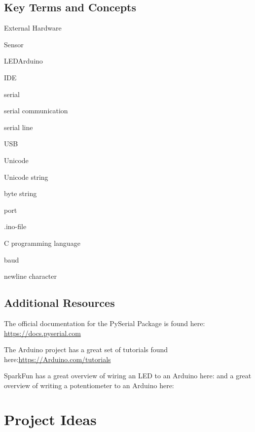 \documentclass{book}
\newenvironment{key_terms}{\begin{multicols}{3}}{\end{multicols}} %
\begin{document}
    
        \subsection{Key Terms and Concepts}\label{key-terms-and-concepts}
    




    
        \begin{key_terms}
        External Hardware

Sensor

LEDArduino

IDE

serial

serial communication

serial line

USB

Unicode

Unicode string

byte string

port

.ino-file

C programming language

baud

newline character
        \end{key_terms}

    




    
        \subsection{Additional Resources}\label{additional-resources}

The official documentation for the PySerial Package is found here:
\protect\hyperlink{}{https://docs.pyserial.com}

The Arduino project has a great set of tutorials found
here:\protect\hyperlink{}{https://Arduino.com/tutorials}

SparkFun has a great overview of wiring an LED to an Arduino here: and a
great overview of writing a potentiometer to an Arduino here:
    




    
        \section{Project Ideas}\label{project-ideas}
    
\end{document}
